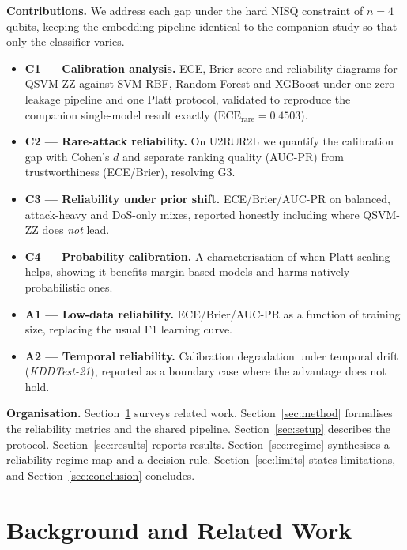 \documentclass[journal]{IEEEtran}
\newcommand{\ZZ}{\textsc{ZZ}}
\newcommand{\QSVM}{QSVM-\ZZ}
\newcommand{\ECE}{\mathrm{ECE}}
\begin{document}
\textbf{Contributions.} We address each gap under the hard NISQ
constraint of $n{=}4$ qubits, keeping the embedding pipeline identical to
the companion study so that only the classifier varies.
\begin{itemize}
\item \textbf{C1 --- Calibration analysis.} ECE, Brier score and
  reliability diagrams for \QSVM{} against SVM-RBF, Random Forest and
  XGBoost under one zero-leakage pipeline and one Platt protocol,
  validated to reproduce the companion single-model result exactly
  ($\ECE_{\text{rare}}{=}0.4503$).
\item \textbf{C2 --- Rare-attack reliability.} On U2R$\cup$R2L we
  quantify the calibration gap with Cohen's $d$ and separate ranking
  quality (AUC-PR) from trustworthiness (ECE/Brier), resolving G3.
\item \textbf{C3 --- Reliability under prior shift.} ECE/Brier/AUC-PR on
  balanced, attack-heavy and DoS-only mixes, reported honestly including
  where \QSVM{} does \emph{not} lead.
\item \textbf{C4 --- Probability calibration.} A characterisation of when
  Platt scaling helps, showing it benefits margin-based models and harms
  natively probabilistic ones.
\item \textbf{A1 --- Low-data reliability.} ECE/Brier/AUC-PR as a
  function of training size, replacing the usual F1 learning curve.
\item \textbf{A2 --- Temporal reliability.} Calibration degradation under
  temporal drift (\textit{KDDTest-21}), reported as a boundary case where
  the advantage does not hold.
\end{itemize}

\textbf{Organisation.} Section~\ref{sec:related} surveys related work.
Section~\ref{sec:method} formalises the reliability metrics and the
shared pipeline. Section~\ref{sec:setup} describes the protocol.
Section~\ref{sec:results} reports results. Section~\ref{sec:regime}
synthesises a reliability regime map and a decision rule.
Section~\ref{sec:limits} states limitations, and
Section~\ref{sec:conclusion} concludes.

\section{Background and Related Work}\label{sec:related}
\end{document}
